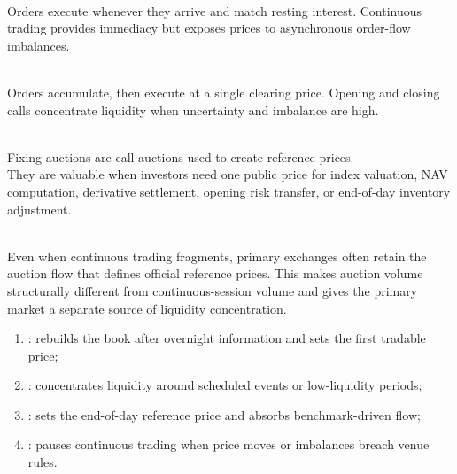 \begin{mechanism} \\
Orders execute whenever they arrive and match resting interest. Continuous trading provides immediacy but exposes prices to asynchronous order-flow imbalances.
\end{mechanism}

\begin{mechanism} \\
Orders accumulate, then execute at a single clearing price. Opening and closing calls concentrate liquidity when uncertainty and imbalance are high.
\end{mechanism}

\begin{mechanism} \\
Fixing auctions are call auctions used to create reference prices.\\
They are valuable when investors need one public price for index valuation, NAV computation, derivative settlement, opening risk transfer, or end-of-day inventory adjustment.
\end{mechanism}

\begin{principle} \\
Even when continuous trading fragments, primary exchanges often retain the auction flow that defines official reference prices. This makes auction volume structurally different from continuous-session volume and gives the primary market a separate source of liquidity concentration.
\end{principle}

\begin{taxonomy} 
\begin{enumerate}[label=\roman*.]
\setlength{\itemsep}{0pt}
\item {}: rebuilds the book after overnight information and sets the first tradable price;
\item {}: concentrates liquidity around scheduled events or low-liquidity periods;
\item {}: sets the end-of-day reference price and absorbs benchmark-driven flow;
\item {}: pauses continuous trading when price moves or imbalances breach venue rules.
\end{enumerate}
\end{taxonomy}

